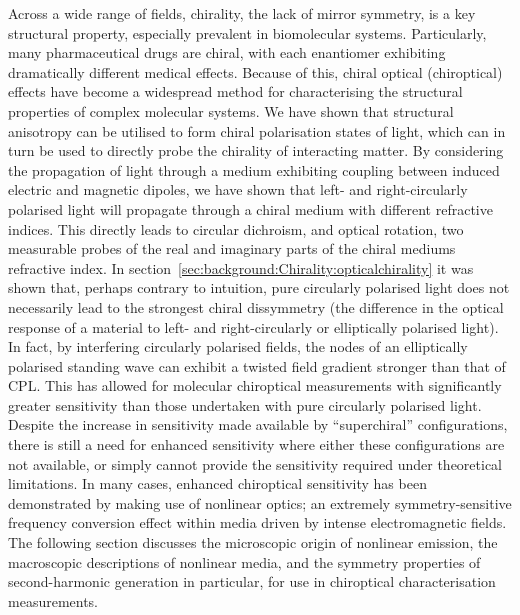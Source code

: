 Across a wide range of fields, chirality, the lack of mirror symmetry, is a key structural property, especially prevalent in biomolecular systems. Particularly, many pharmaceutical drugs are chiral, with each enantiomer exhibiting dramatically different medical effects.
Because of this, chiral optical (chiroptical) effects have become a widespread method for characterising the structural properties of complex molecular systems.
We have shown that structural anisotropy can be utilised to form chiral polarisation states of light, which can in turn be used to directly probe the chirality of interacting matter.
By considering the propagation of light through a medium exhibiting coupling between induced electric and magnetic dipoles, we have shown that left- and right-circularly polarised light will propagate through a chiral medium with different refractive indices. This directly leads to circular dichroism, and optical rotation, two measurable probes of the real and imaginary parts of the chiral mediums refractive index.
In section~\ref{sec:background:Chirality:opticalchirality} it was shown that, perhaps contrary to intuition, pure circularly polarised light does not necessarily lead to the strongest chiral dissymmetry (the difference in the optical response of a material to left- and right-circularly or elliptically polarised light). In fact, by interfering circularly polarised fields, the nodes of an elliptically polarised standing wave can exhibit a twisted field gradient stronger than that of CPL. This has allowed for molecular chiroptical measurements with significantly greater sensitivity than those undertaken with pure circularly polarised light.
Despite the increase in sensitivity made available by ``superchiral'' configurations, there is still a need for enhanced sensitivity where either these configurations are not available, or simply cannot provide the sensitivity required under theoretical limitations.
In many cases, enhanced chiroptical sensitivity has been demonstrated by making use of nonlinear optics; an extremely symmetry-sensitive frequency conversion effect within media driven by intense electromagnetic fields. The following section discusses the microscopic origin of nonlinear emission, the macroscopic descriptions of nonlinear media, and the symmetry properties of second-harmonic generation in particular, for use in chiroptical characterisation measurements.